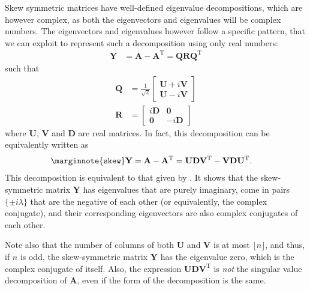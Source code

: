 \documentclass{article}
\begin{document}
Skew symmetric matrices have well-defined eigenvalue decompositions,
which are however complex, as both the eigenvectors and eigenvalues will
be complex numbers.  The eigenvectors and eigenvalues however follow a
specific pattern, that we can exploit to represent such a decomposition
using only real numbers:
\begin{align}
  \mathbf Y &= \mathbf A - \mathbf A^{\mathrm T} = \mathbf Q \mathbf R \mathbf Q^{\mathrm T}
\end{align}
such that
\begin{align}
  \mathbf Q &= \frac 1 {\sqrt{2}} \left[
    \begin{array}{cc}
      \mathbf U + i \mathbf V \\
      \mathbf U - i \mathbf V 
    \end{array}
    \right] \\
  \mathbf R &= \left[ \begin{array}{cc}
      i \mathbf D & \mathbf 0 \\
      \mathbf 0 & -i \mathbf D
    \end{array} \right]
\end{align}
where $\mathbf U$, $\mathbf V$ and $\mathbf D$ are real matrices.  In
fact, this decomposition can be equivalently written as
\begin{align}
  \marginnote{\texttt{skew}}
  \mathbf Y = \mathbf A - \mathbf A^{\mathrm T} &=
  \mathbf U \mathbf D \mathbf V^{\mathrm T} - \mathbf V \mathbf D \mathbf U^{\mathrm T}.
\end{align}
This decomposition is equivalent to that given by 
\cite{b869}.  It shows that the skew-symmetric matrix $\mathbf Y$ has
eigenvalues that are purely imaginary, come  
in pairs $\{\pm i \lambda\}$ that are the negative of each other (or
equivalently, the complex conjugate), and their corresponding
eigenvectors are also complex conjugates of each other.

Note also that the number of columns of both $\mathbf U$ and $\mathbf V$
is at most $\lfloor n \rfloor$, and thus, if $n$ is odd, the
skew-symmetric matrix $\mathbf Y$ has the
eigenvalue zero, which is the complex conjugate of itself.  Also, the
expression $\mathbf U \mathbf D \mathbf V^{\mathrm T}$ is \emph{not} the
singular value decomposition of $\mathbf A$, even if the form of the
decomposition is the same. 
\end{document}
